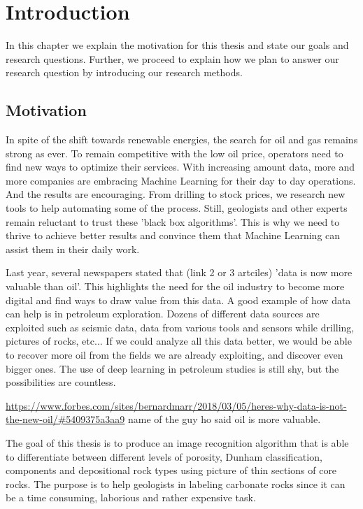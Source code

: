 \chapter{Introduction}
\label{chp:introduction} 
In this chapter we explain the motivation for this thesis and state our goals and research questions. Further, we  proceed to explain how we plan to answer our research question by introducing our research methods.   
\section{Motivation}
In spite of the shift towards renewable energies, the search for oil and gas remains strong as ever. To remain competitive with the low oil price, operators need to find new ways to optimize their services. 
With increasing amount data,  more and more companies are embracing Machine Learning for their day to day operations. And the results are encouraging. 
From drilling to stock prices, we research  new tools to help automating some of the process. 
Still, geologists and other experts remain reluctant to trust these 'black box algorithms'. This is why we need to thrive to achieve better results and convince them that Machine Learning can assist them in their daily work.

Last year, several newspapers stated that (link 2 or 3 artciles) 'data is now more valuable than oil'. This highlights the need for the oil industry to become more digital and find ways to draw value from this data. A good example of how data can help is in petroleum exploration. Dozens of different data sources are exploited such as seismic data, data from various tools and sensors while drilling, pictures of rocks, etc... If  we could analyze all this data better, we would be able to recover more oil from the fields we are already exploiting, and discover even bigger ones. The use of deep learning in petroleum studies is still shy, but the possibilities are countless.

\url{https://www.forbes.com/sites/bernardmarr/2018/03/05/heres-why-data-is-not-the-new-oil/#5409375a3aa9} name of the guy ho said oil is more valuable. 


The goal of this thesis is to produce an image recognition algorithm that is able to differentiate between different levels of porosity,  Dunham classification, components and depositional rock types using picture of thin sections of core rocks. The purpose is to help geologists in labeling carbonate rocks since it can be a time consuming, laborious and rather expensive task. 

